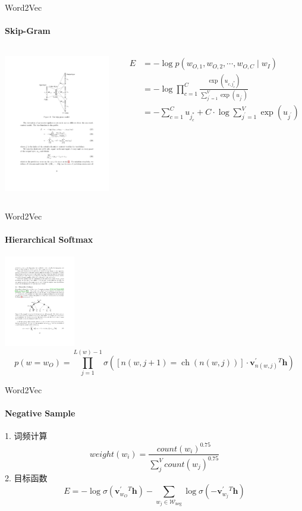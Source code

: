 \documentclass{beamer}
\begin{document}
\begin{frame}{Word2Vec}
    \framesubtitle{Skip-Gram}
    \begin{columns}
        \begin{column}{0.4\textwidth}
            \centering\includegraphics[height=6cm]{word2vec_3.pdf}
        \end{column}
        \begin{column}{0.6\textwidth}
            $$
            \begin{aligned}
            E &=-\log p\left(w_{O, 1}, w_{O, 2}, \cdots, w_{O, C} \mid w_{I}\right) \\
            &=-\log \prod_{c=1}^{C} \frac{\exp \left(u_{c, j_{c}^{*}}\right)}{\sum_{j^{\prime}=1}^{V} \exp \left(u_{j^{\prime}}\right)} \\
            &=-\sum_{c=1}^{C} u_{j_{c}^{*}}+C \cdot \log \sum_{j^{\prime}=1}^{V} \exp \left(u_{j^{\prime}}\right)
            \end{aligned}
            $$
        \end{column}
    \end{columns}
\end{frame}
\begin{frame}{Word2Vec}
    \framesubtitle{Hierarchical Softmax}
    \centering\includegraphics[height=4cm]{word2vec_4.pdf}
    $$
        p\left(w=w_{O}\right)=\prod_{j=1}^{L(w)-1} \sigma\left([ n(w, j+1)=\operatorname{ch}(n(w, j)) ] \cdot \mathbf{v}_{n(w, j)}^{\prime}{ }^{T} \mathbf{h}\right)
    $$
\end{frame}
\begin{frame}{Word2Vec}
    \framesubtitle{Negative Sample}
    1. 词频计算
    $$
        weight(w_i) = \frac{count(w_i)^{0.75}}{\sum_{j}^{V} count(w_j)^{0.75}}
    $$
    2. 目标函数
    $$
        E=-\log \sigma\left(\mathbf{v}_{w_{O}}^{\prime}{ }^{T} \mathbf{h}\right)-\sum_{w_{j} \in \mathcal{W}_{\mathrm{neg}}} \log \sigma\left(-\mathbf{v}_{w_{j}}^{\prime}{ }^{T} \mathbf{h}\right)
    $$
\end{frame}
\end{document}
